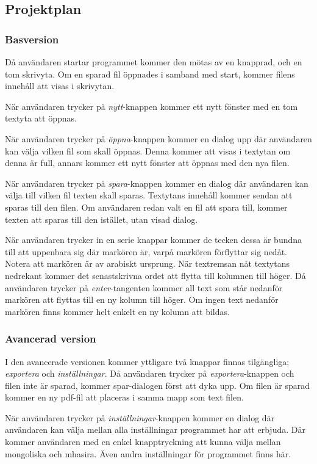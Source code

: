 \documentclass[a4paper,11p,twoside]{article}
\begin{document}
\subsection{Projektplan}
\subsubsection{Basversion}
Då användaren startar programmet kommer den mötas av en knapprad, och en tom skrivyta. Om en sparad fil öppnades i samband med start, kommer filens innehåll att visas i skrivytan.

När användaren trycker på \emph{nytt}-knappen kommer ett nytt fönster med en tom textyta att öppnas. 

När användaren trycker på \emph{öppna}-knappen kommer en dialog upp där användaren kan välja vilken fil som skall öppnas. Denna kommer att visas i textytan om denna är full, annars kommer ett nytt fönster att öppnas med den nya filen.

När användaren trycker på \emph{spara}-knappen kommer en dialog där användaren kan välja till vilken fil texten skall sparas. Textytans innehåll kommer sendan att sparas till den filen. Om användaren redan valt en fil att spara till, kommer texten att sparas till den istället, utan visad dialog.

När användaren trycker in en serie knappar kommer de tecken dessa är bundna till att uppenbara sig där markören är, varpå markören förflyttar sig nedåt. Notera att markören är av arabiskt ursprung. När textremsan nåt textytans nedrekant kommer det senastskrivna ordet att flytta till kolumnen till höger. Då användaren trycker på \emph{enter}-tangenten kommer all text som står nedanför markören att flyttas till en ny kolumn till höger. Om ingen text nedanför markören finns kommer helt enkelt en ny kolumn att bildas.

\subsubsection{Avancerad version}
I den avancerade versionen kommer yttligare två knappar finnas tilgängliga; \emph{exportera} och \emph{inställningar}. Då användaren trycker på \emph{exportera}-knappen och filen inte är sparad, kommer spar-dialogen först att dyka upp. Om filen är sparad kommer en ny pdf-fil att placeras i samma mapp som text filen.

När användaren trycker på \emph{inställningar}-knappen kommer en dialog där användaren kan välja mellan alla inställningar programmet har att erbjuda. Där kommer användaren med en enkel knapptryckning att kunna välja mellan mongoliska och mhasira. Även andra inställningar för programmet finns här.
\end{document}
